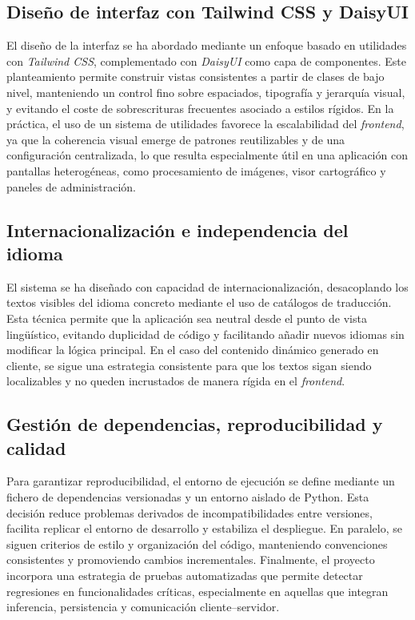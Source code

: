 \subsection{Diseño de interfaz con Tailwind CSS y DaisyUI}

El diseño de la interfaz se ha abordado mediante un enfoque basado en utilidades con \textit{Tailwind CSS}, complementado con \textit{DaisyUI} como capa de componentes. Este planteamiento permite construir vistas consistentes a partir de clases de bajo nivel, manteniendo un control fino sobre espaciados, tipografía y jerarquía visual, y evitando el coste de sobrescrituras frecuentes asociado a estilos rígidos. En la práctica, el uso de un sistema de utilidades favorece la escalabilidad del \textit{frontend}, ya que la coherencia visual emerge de patrones reutilizables y de una configuración centralizada, lo que resulta especialmente útil en una aplicación con pantallas heterogéneas, como procesamiento de imágenes, visor cartográfico y paneles de administración.

\subsection{Internacionalización e independencia del idioma}

El sistema se ha diseñado con capacidad de internacionalización, desacoplando los textos visibles del idioma concreto mediante el uso de catálogos de traducción. Esta técnica permite que la aplicación sea neutral desde el punto de vista lingüístico, evitando duplicidad de código y facilitando añadir nuevos idiomas sin modificar la lógica principal. En el caso del contenido dinámico generado en cliente, se sigue una estrategia consistente para que los textos sigan siendo localizables y no queden incrustados de manera rígida en el \textit{frontend}.

\subsection{Gestión de dependencias, reproducibilidad y calidad}

Para garantizar reproducibilidad, el entorno de ejecución se define mediante un fichero de dependencias versionadas y un entorno aislado de Python. Esta decisión reduce problemas derivados de incompatibilidades entre versiones, facilita replicar el entorno de desarrollo y estabiliza el despliegue. En paralelo, se siguen criterios de estilo y organización del código, manteniendo convenciones consistentes y promoviendo cambios incrementales. Finalmente, el proyecto incorpora una estrategia de pruebas automatizadas que permite detectar regresiones en funcionalidades críticas, especialmente en aquellas que integran inferencia, persistencia y comunicación cliente--servidor.

